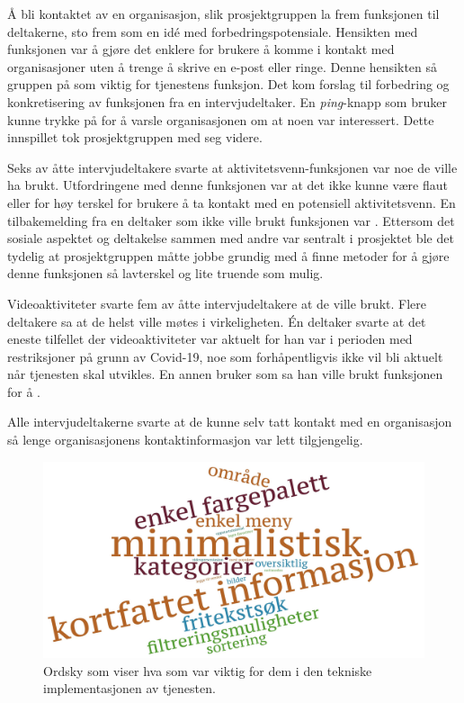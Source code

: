 Å bli kontaktet av en organisasjon, slik prosjektgruppen la frem funksjonen til deltakerne, sto frem som en idé med forbedringspotensiale. Hensikten med funksjonen var å gjøre det enklere for brukere å komme i kontakt med organisasjoner uten å trenge å skrive en e-post eller ringe. Denne hensikten så gruppen på som viktig for tjenestens funksjon. Det kom forslag til forbedring og konkretisering av funksjonen fra en intervjudeltaker. En {\em  ping}-knapp som bruker kunne trykke på for å varsle organisasjonen om at noen var interessert. Dette innspillet tok prosjektgruppen med seg videre.

Seks av åtte intervjudeltakere svarte at aktivitetsvenn-funksjonen var noe de ville ha brukt. Utfordringene med denne funksjonen var at det ikke kunne være flaut eller for høy terskel for brukere å ta kontakt med en potensiell aktivitetsvenn. En tilbakemelding fra en deltaker som ikke ville brukt funksjonen var . Ettersom det sosiale aspektet og deltakelse sammen med andre var sentralt i prosjektet ble det tydelig at prosjektgruppen måtte jobbe grundig med å finne metoder for å gjøre denne funksjonen så lavterskel og lite truende som mulig. 

Videoaktiviteter svarte fem av åtte intervjudeltakere at de ville brukt. Flere deltakere sa at de helst ville møtes i virkeligheten. Én deltaker svarte at det eneste tilfellet der videoaktiviteter var aktuelt for han var i perioden med restriksjoner på grunn av Covid-19, noe som forhåpentligvis ikke vil bli aktuelt når tjenesten skal utvikles. En annen bruker som sa han ville brukt funksjonen for å .

Alle intervjudeltakerne svarte at de kunne selv tatt kontakt med en organisasjon så lenge organisasjonens kontaktinformasjon var lett tilgjengelig.

\begin{figure}[H]
\includegraphics[width=\textwidth]{Illustrasjoner/ordsky-funksjoner.jpg}
\caption{Ordsky som viser hva som var viktig for dem i den tekniske implementasjonen av tjenesten.}
\label{fig:ordsky-funksjoner}
\end{figure}

